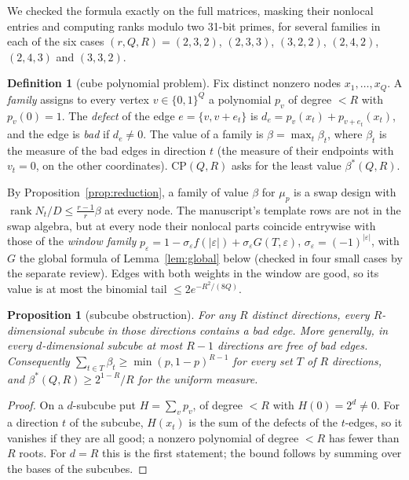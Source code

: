 \documentclass[11pt]{article}
\newtheorem{proposition}[theorem]{Proposition}
\theoremstyle{definition}
\newtheorem{definition}[theorem]{Definition}
\theoremstyle{remark}
\newcommand{\rank}{\operatorname{rank}}
\newcommand{\CP}{\mathrm{CP}}
\begin{document}
We checked the formula exactly on the full matrices, masking their nonlocal entries and computing ranks modulo two 31-bit primes, for several families in each of the six cases $(r,Q,R)=(2,3,2)$, $(2,3,3)$, $(3,2,2)$, $(2,4,2)$, $(2,4,3)$ and $(3,3,2)$.

\begin{definition}[cube polynomial problem]
Fix distinct nonzero nodes $x_1,\dots,x_Q$. A \emph{family} assigns to every vertex $v\in\{0,1\}^Q$ a polynomial $p_v$ of degree $<R$ with $p_v(0)=1$. The \emph{defect} of the edge $e=\{v,v+e_t\}$ is $d_e=p_v(x_t)+p_{v+e_t}(x_t)$, and the edge is \emph{bad} if $d_e\ne0$. The value of a family is $\beta=\max_t\beta_t$, where $\beta_t$ is the measure of the bad edges in direction $t$ (the measure of their endpoints with $v_t=0$, on the other coordinates). $\CP(Q,R)$ asks for the least value $\beta^*(Q,R)$.
\end{definition}

By Proposition~\ref{prop:reduction}, a family of value $\beta$ for $\mu_p$ is a swap design with $\rank N_t/D\le\frac{r-1}r\beta$ at every node. The manuscript's template rows are not in the swap algebra, but at every node their nonlocal parts coincide entrywise with those of the \emph{window family} $p_\varepsilon=1-\sigma_\varepsilon f(|\varepsilon|)+\sigma_\varepsilon G(T,\varepsilon)$, $\sigma_\varepsilon=(-1)^{|\varepsilon|}$, with $G$ the global formula of Lemma~\ref{lem:global} below (checked in four small cases by the separate review). Edges with both weights in the window are good, so its value is at most the binomial tail $\le2e^{-R^2/(8Q)}$.

\begin{proposition}[subcube obstruction]\label{prop:subcube}
For any $R$ distinct directions, every $R$-dimensional subcube in those directions contains a bad edge. More generally, in every $d$-dimensional subcube at most $R-1$ directions are free of bad edges. Consequently $\sum_{t\in T}\beta_t\ge\min(p,1-p)^{R-1}$ for every set $T$ of $R$ directions, and $\beta^*(Q,R)\ge2^{1-R}/R$ for the uniform measure.
\end{proposition}

\begin{proof}
On a $d$-subcube put $H=\sum_vp_v$, of degree $<R$ with $H(0)=2^d\ne0$. For a direction $t$ of the subcube, $H(x_t)$ is the sum of the defects of the $t$-edges, so it vanishes if they are all good; a nonzero polynomial of degree $<R$ has fewer than $R$ roots. For $d=R$ this is the first statement; the bound follows by summing over the bases of the subcubes.
\end{proof}
\end{document}
